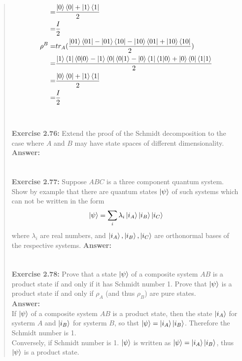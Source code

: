 \documentclass[UTF8]{ctexart}
\begin{document}
\begin{quote}
\begin{equation}
\begin{aligned}
					=&\frac{\ket{0}\bra{0}+\ket{1}\bra{1}}{2}\\
					=&\frac{I}{2} \\
					\rho^{B}=&tr_{A}(\frac{\ket{01}\bra{01}-\ket{01}\bra{10}-\ket{10}\bra{01}+\ket{10}\bra{10}}{2}) \\
					=&\frac{\ket{1}\bra{1}\bra{0}\ket{0}-\ket{1}\bra{0}\bra{0}\ket{1}-\ket{0}\bra{1}\bra{1}\ket{0}+\ket{0}\bra{0}\bra{1}\ket{1}}{2}\\
					=&\frac{\ket{0}\bra{0}+\ket{1}\bra{1}}{2}\\
					=&\frac{I}{2} \\
	\end{aligned}
\end{equation}
\\
\\
\textbf{Exercise 2.76: } Extend the proof of the Schmidt decomposition to the case where $A$
and $B$ may have state spaces of different dimensionality.\\
\textbf{Answer:}\\
\\
\\
\textbf{Exercise 2.77: } Suppose $ABC$ is a three component quantum system. 
Show by example that there are quantum states $ \ket{\psi}$ of such systems
 which can not be written in the form
 \begin{equation}
	 \begin{aligned}
		 \ket{\psi}=\sum_{i}\lambda_{i}\ket{i_{A}}\ket{i_{B}}\ket{i_{C}}
	 \end{aligned}
 \end{equation}
 where $\lambda_{i}$ are real numbers, and $\ket{i_{A}},\ket{i_{B}},\ket{i_{C}} $ 
 are orthonormal bases of the respective systems.
	\textbf{Answer:}\\
	\\
\\
\textbf{Exercise 2.78: } Prove that a state $ \ket{\psi}$  of a composite system $AB$
 is a product state if and only if it has Schmidt number 1. Prove that $ \ket{\psi}$ 
  is a product state if and only if $\rho_{A}$ (and thus  $\rho_{B}$) are pure states.
 \\
\textbf{Answer:}\\
If $\ket{\psi}$ of a composite system $AB$ is a product state, then the state $\ket{i_{A}} $ for systerm $A$ and $\ket{i_{B}}$ for systerm $B$, 
so thst $\ket{\psi}=\ket{i_{A}}\ket{i_{B}}$. Therefore the Schmidt number is 1. \\
Conversely, if Schmidt number is 1. $\ket{\psi}$ is written as $\ket{\psi}=\ket{i_{A}}\ket{i_{B}}$, thus $\ket{\psi}$ is a product state.

\end{quote}
\end{document}
